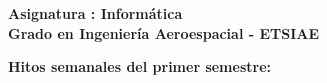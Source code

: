 \documentclass[12pt,spanish]{article}
\begin{document}
\begin{center}
	{\bf Asignatura : Informática}                                               
	\\
	{\bf Grado en Ingeniería Aeroespacial - ETSIAE}                                            \\

\end{center}

\vspace{0.5cm}

\noindent
{\bf \Large Hitos semanales del primer semestre: 
}                                                                               
     \\

\vspace{-1.cm}
\end{document}

